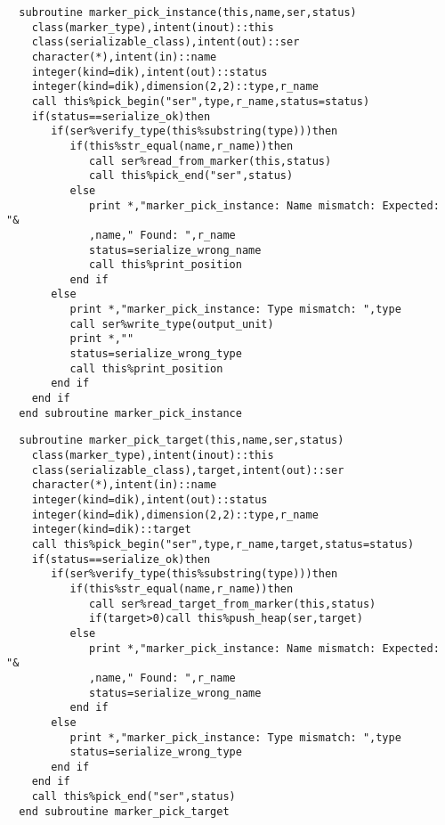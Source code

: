 \begin{Verbatim}
  subroutine marker_pick_instance(this,name,ser,status)
    class(marker_type),intent(inout)::this
    class(serializable_class),intent(out)::ser
    character(*),intent(in)::name
    integer(kind=dik),intent(out)::status
    integer(kind=dik),dimension(2,2)::type,r_name
    call this%pick_begin("ser",type,r_name,status=status)
    if(status==serialize_ok)then
       if(ser%verify_type(this%substring(type)))then
          if(this%str_equal(name,r_name))then
             call ser%read_from_marker(this,status)
             call this%pick_end("ser",status)
          else
             print *,"marker_pick_instance: Name mismatch: Expected: "&
             ,name," Found: ",r_name
             status=serialize_wrong_name
             call this%print_position
          end if
       else
          print *,"marker_pick_instance: Type mismatch: ",type
          call ser%write_type(output_unit)
          print *,""
          status=serialize_wrong_type
          call this%print_position
       end if
    end if
  end subroutine marker_pick_instance
\end{Verbatim}

\begin{Verbatim}
  subroutine marker_pick_target(this,name,ser,status)
    class(marker_type),intent(inout)::this
    class(serializable_class),target,intent(out)::ser
    character(*),intent(in)::name
    integer(kind=dik),intent(out)::status
    integer(kind=dik),dimension(2,2)::type,r_name
    integer(kind=dik)::target
    call this%pick_begin("ser",type,r_name,target,status=status)
    if(status==serialize_ok)then
       if(ser%verify_type(this%substring(type)))then
          if(this%str_equal(name,r_name))then
             call ser%read_target_from_marker(this,status)
             if(target>0)call this%push_heap(ser,target)
          else
             print *,"marker_pick_instance: Name mismatch: Expected: "&
             ,name," Found: ",r_name
             status=serialize_wrong_name
          end if
       else
          print *,"marker_pick_instance: Type mismatch: ",type
          status=serialize_wrong_type
       end if
    end if
    call this%pick_end("ser",status)
  end subroutine marker_pick_target
\end{Verbatim}

